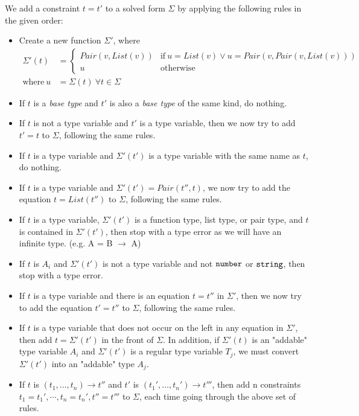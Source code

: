 We add a constraint $t = t'$ to a solved form $\Sigma$ by applying the following rules
in the given order:
\begin{itemize}
\item Create a new function $\Sigma'$, where
\begin{align*}
\Sigma'(t) & = \begin{cases}
Pair(v, List(v)) & \text{if} \ u = List(v) \vee u = Pair(v,Pair(v,List(v)))\\
u & \text{otherwise}
\end{cases}\\
\text{where} \ u & = \Sigma(t) \ \forall t \in \Sigma
\end{align*}
\item If $t$ is a \emph{base type} and $t'$ is also a \emph{base type} of the same kind, do nothing.
\item If $t$ is not a type variable and $t'$ is a type variable, then we now try to add $t' = t$ to
$\Sigma$, following the same rules.
\item If $t$ is a type variable and $\Sigma'(t')$ is a type variable with the same name as $t$, do nothing.
\item If $t$ is a type variable and $\Sigma'(t')=Pair(t'', t)$, we now try to add the equation $t = List(t'')$ to $\Sigma$, following the same rules.
\item If $t$ is a type variable, $\Sigma'(t')$ is a function type, list type, or pair type, and $t$ is contained in $\Sigma'(t')$, then stop
  with a type error as we will have an infinite type. (e.g. A = B $\rightarrow$ A)
\item If $t$ is $A_i$ and $\Sigma'(t')$ is not a type variable and not $\texttt{number}$ or $\texttt{string}$,
  then stop with a type error.
\item If $t$ is a type variable and there is an equation $t = t''$ in $\Sigma'$, then
  we now try to add the equation $t' = t''$ to $\Sigma$, following the same rules.
\item If $t$ is a type variable that does not occur on the left in any equation in $\Sigma'$,
  then add $t = \Sigma'(t')$ in the front of $\Sigma$. In addition, if $\Sigma'(t)$ is an "addable"
  type variable $A_i$ and $\Sigma'(t')$ is a regular type variable $T_j$, we must convert $\Sigma'(t')$
  into an "addable" type $A_j$.  
\item If $t$ is $(t_1,\ldots, t_n) \rightarrow t''$ and
  $t'$ is $(t_1',\ldots, t_n') \rightarrow t'''$, then add n constraints
  $t_1 = t_1', \cdots, t_n = t_n', t'' = t'''$ to $\Sigma$, each time going through the above set of rules.

\end{itemize}
